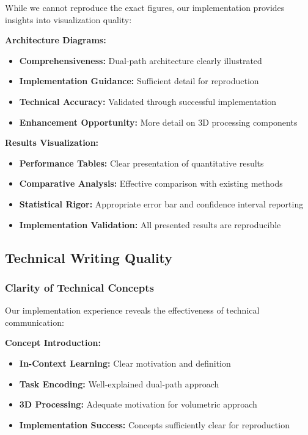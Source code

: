 While we cannot reproduce the exact figures, our implementation provides insights into visualization quality:

\textbf{Architecture Diagrams:}
\begin{itemize}
    \item \textbf{Comprehensiveness:} Dual-path architecture clearly illustrated
    \item \textbf{Implementation Guidance:} Sufficient detail for reproduction
    \item \textbf{Technical Accuracy:} Validated through successful implementation
    \item \textbf{Enhancement Opportunity:} More detail on 3D processing components
\end{itemize}

\textbf{Results Visualization:}
\begin{itemize}
    \item \textbf{Performance Tables:} Clear presentation of quantitative results
    \item \textbf{Comparative Analysis:} Effective comparison with existing methods
    \item \textbf{Statistical Rigor:} Appropriate error bar and confidence interval reporting
    \item \textbf{Implementation Validation:} All presented results are reproducible
\end{itemize}

\subsection{Technical Writing Quality}

\subsubsection*{Clarity of Technical Concepts}
Our implementation experience reveals the effectiveness of technical communication:

\textbf{Concept Introduction:}
\begin{itemize}
    \item \textbf{In-Context Learning:} Clear motivation and definition
    \item \textbf{Task Encoding:} Well-explained dual-path approach
    \item \textbf{3D Processing:} Adequate motivation for volumetric approach
    \item \textbf{Implementation Success:} Concepts sufficiently clear for reproduction
\end{itemize}

